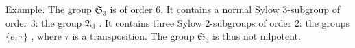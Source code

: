 Example. The group \(\mathfrak{S}_3\) is of order 6. It contains a normal Sylow 3-subgroup of order 3: the group \(\mathfrak{A}_3\) . It contains three Sylow 2-subgroups of order 2: the groups \(\{e, \tau\}\) , where \(\tau\) is a transposition. The group \(\mathfrak{S}_3\) is thus not nilpotent.

